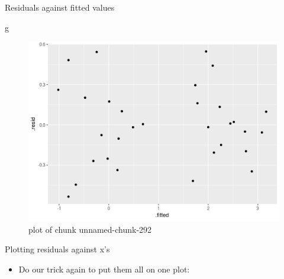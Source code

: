 \documentclass[ignorenonframetext,]{beamer}
\newenvironment{Shaded}{\begin{snugshade}}{\end{snugshade}}
\newcommand{\DataTypeTok}[1]{\textcolor[rgb]{0.13,0.29,0.53}{#1}}
\newcommand{\DecValTok}[1]{\textcolor[rgb]{0.00,0.00,0.81}{#1}}
\newcommand{\FloatTok}[1]{\textcolor[rgb]{0.00,0.00,0.81}{#1}}
\newcommand{\KeywordTok}[1]{\textcolor[rgb]{0.13,0.29,0.53}{\textbf{#1}}}
\newcommand{\NormalTok}[1]{#1}
\newcommand{\OperatorTok}[1]{\textcolor[rgb]{0.81,0.36,0.00}{\textbf{#1}}}
\newcommand{\StringTok}[1]{\textcolor[rgb]{0.31,0.60,0.02}{#1}}
\providecommand{\tightlist}{%
  \setlength{\itemsep}{0pt}\setlength{\parskip}{0pt}}
\begin{document}
\begin{frame}[fragile]{Residuals against fitted values}
\protect\hypertarget{residuals-against-fitted-values}{}

\begin{Shaded}
\begin{Highlighting}[]
\NormalTok{g}
\end{Highlighting}
\end{Shaded}

\begin{figure}
\centering
\includegraphics{figure/unnamed-chunk-292-1.png}
\caption{plot of chunk unnamed-chunk-292}
\end{figure}

\end{frame}

\begin{frame}[fragile]{Plotting residuals against x's}
\protect\hypertarget{plotting-residuals-against-xs}{}

\begin{itemize}
\tightlist
\item
  Do our trick again to put them all on one plot:
\end{itemize}

\begin{Shaded}
\end{Shaded}

\end{frame}
\end{document}
